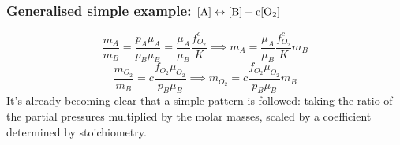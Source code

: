 \subsubsection{Generalised simple example: $[\rm{A}]\leftrightarrow [\rm{B}] + c [\rm{O}_2]$}
\begin{equation}
\frac{m_{A}}{m_{B}} = \frac{p_{A} \mu_{A}}{p_{B} \mu_{B}} = \frac{\mu_{A}}{\mu_{B}} \frac{f_{O_2}^{c}}{K} \implies m_{A} = \frac{\mu_{A}}{\mu_{B}} \frac{f_{O_2}^{c}}{K} m_{B}
\end{equation}
\begin{equation}
\frac{m_{O_2}}{m_{B}} = c \frac{ f_{O_2} \mu_{O_2}}{p_{B} \mu_{B}} \implies m_{O_2} = c \frac{ f_{O_2} \mu_{O_2}}{p_{B} \mu_{B}} m_{B}
\end{equation}
It's already becoming clear that a simple pattern is followed: taking the ratio of the partial pressures multiplied by the molar masses, scaled by a coefficient determined by stoichiometry.
